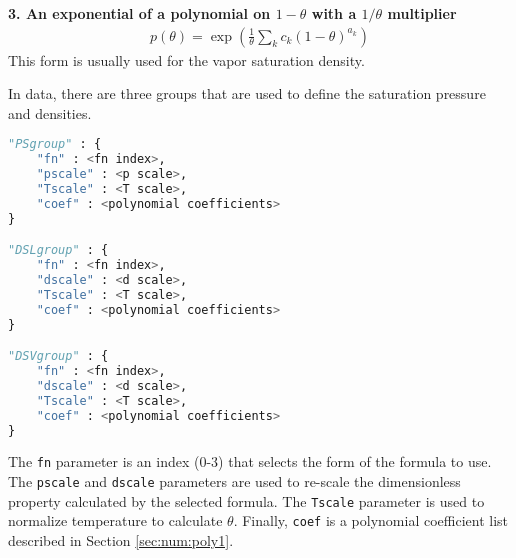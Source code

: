 {\bf 3. An exponential of a polynomial on $1-\theta$ with a $1/\theta$ multiplier}
\begin{align}
p(\theta) = \exp \left( \frac{1}{\theta} \sum_k c_k (1-\theta)^{a_k} \right)
\end{align}
This form is usually used for the vapor saturation density.

In data, there are three groups that are used to define the saturation pressure and densities.
\begin{lstlisting}[language=Python]
"PSgroup" : {
    "fn" : <fn index>,
    "pscale" : <p scale>,
    "Tscale" : <T scale>,
    "coef" : <polynomial coefficients>
}

"DSLgroup" : {
    "fn" : <fn index>,
    "dscale" : <d scale>,
    "Tscale" : <T scale>,
    "coef" : <polynomial coefficients>
}

"DSVgroup" : {
    "fn" : <fn index>,
    "dscale" : <d scale>,
    "Tscale" : <T scale>,
    "coef" : <polynomial coefficients>
}
\end{lstlisting}

The \texttt{fn} parameter is an index (0-3) that selects the form of the formula to use.  The \texttt{pscale} and \texttt{dscale} parameters are used to re-scale the dimensionless property calculated by the selected formula.  The \texttt{Tscale} parameter is used to normalize temperature to calculate $\theta$.  Finally, \texttt{coef} is a polynomial coefficient list described in Section \ref{sec:num:poly1}.
